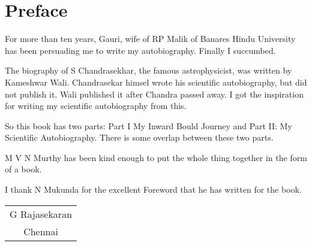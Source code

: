 \chapter{Preface}

For more than ten years, Gauri, wife of RP Malik of Banares Hindu Universi\-ty has been persuading me to write my autobio\-graphy. Finally I succumbed.

The biography of S Chandrasekhar, the famous astrophysicist, was
written by Kameshwar Wali. Chandrasekar himsel wrote his scientific
autobiography, but did not publish it. Wali published it after Chandra
passed away. I got the inspiration for writing my scientific autobio\-graphy
from this.

So this book has two parts: Part I My Inward Bould Journey and Part II:
My Scientific Autobiography. There is some overlap between these two
parts.

M V N Murthy has been kind enough to put the whole thing together in the 
form of a book.

I thank N Mukunda for the excellent Foreword that he has written for 
the book.

\vskip 1cm
\begin{flushright}
\begin{tabular}{c}
G Rajasekaran\\
Chennai
\end{tabular}
\end{flushright}
